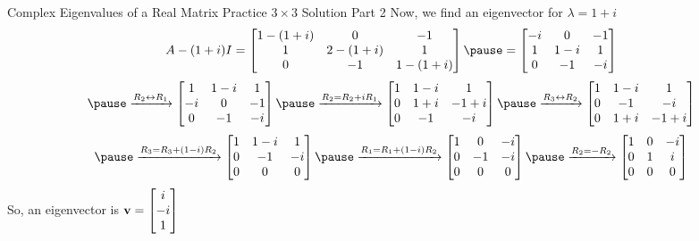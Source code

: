\documentclass[xcoler=dvipsnames, aspectratio=169]{beamer}
\begin{document}
    \begin{frame}{Complex Eigenvalues of a Real Matrix Practice $3\times 3$ Solution Part 2}
        \small
        Now, we find an eigenvector for $\lambda=1+i$
        \[
            A-(1+i)I = \bMat{
                1-(1+i) & 0 & -1\\
                1 & 2-(1+i) &  1\\
                0 & -1 & 1-(1+i)
            }\pause = \bMat{
                -i & 0 & -1\\
                1 & 1-i& 1\\
                0 & -1 & -i
            }
        \]
        \vspace{-5pt}
        \[
            \pause\xrightarrow{R_2\leftrightarrow R_1}\bMat{
                1 & 1-i& 1\\
                -i & 0 & -1\\
                0 & -1 & -i
            }\pause\xrightarrow{R_2 = R_2 + iR_1}\bMat{
                1 & 1-i& 1\\
                0 & 1+i& -1+i\\
                0 & -1 & -i
            }\pause\xrightarrow{R_3\leftrightarrow R_2}\bMat{
                1 & 1-i& 1\\
                0 & -1 & -i\\
                0 & 1+i& -1+i
            }
        \]
        \[
            \pause\xrightarrow{R_3=R_3 + (1-i)R_2}\bMat{
                1 & 1-i& 1\\
                0 & -1 & -i\\
                0 & 0& 0
            }\pause\xrightarrow{R_1=R_1+(1-i)R_2}\bMat{
                1 & 0  & -i\\
                0 & -1 & -i\\
                0 & 0& 0
            }\pause\xrightarrow{R_2=-R_2}\bMat{
                1 & 0  & -i\\
                0 & 1 & i\\
                0 & 0& 0
            }
        \]
        So, an eigenvector is $\mathbf{v} = \begin{bmatrix}i\\-i\\1\end{bmatrix}$
    \end{frame}
\end{document}
